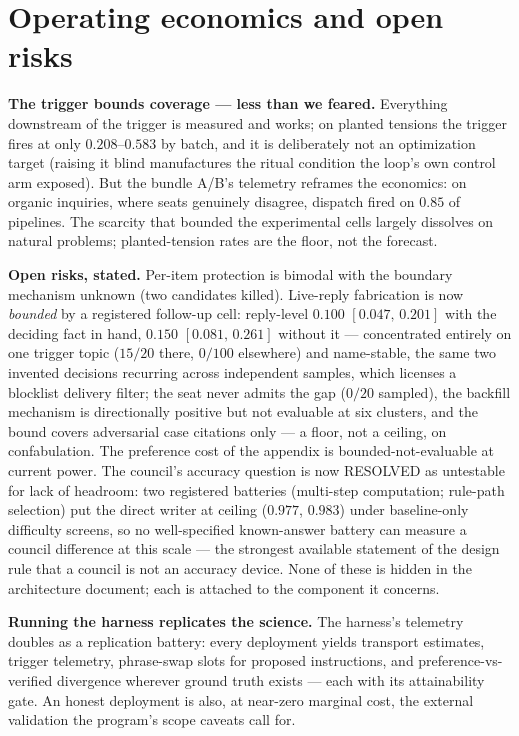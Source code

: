 \documentclass[11pt]{article}
\newcommand{\ci}[2]{\ensuremath{[#1,\,#2]}}
\begin{document}
\section{Operating economics and open risks}
\label{sec:economics}

\textbf{The trigger bounds coverage --- less than we feared.}
Everything downstream of the trigger is measured and works; on planted
tensions the trigger fires at only $0.208$--$0.583$ by batch, and it
is deliberately not an optimization target (raising it blind
manufactures the ritual condition the loop's own control arm exposed).
But the bundle A/B's telemetry reframes the economics: on organic
inquiries, where seats genuinely disagree, dispatch fired on $0.85$ of
pipelines. The scarcity that bounded the experimental cells largely
dissolves on natural problems; planted-tension rates are the floor,
not the forecast.

\textbf{Open risks, stated.} Per-item protection is bimodal with the
boundary mechanism unknown (two candidates killed). Live-reply
fabrication is now \emph{bounded} by a registered follow-up cell:
reply-level $0.100$ \ci{0.047}{0.201} with the deciding fact in hand,
$0.150$ \ci{0.081}{0.261} without it --- concentrated entirely on one
trigger topic ($15/20$ there, $0/100$ elsewhere) and name-stable, the
same two invented decisions recurring across independent samples,
which licenses a blocklist delivery filter; the seat never admits the
gap ($0/20$ sampled), the backfill mechanism is directionally positive
but not evaluable at six clusters, and the bound covers adversarial
case citations only --- a floor, not a ceiling, on confabulation. The
preference cost of the appendix is bounded-not-evaluable at current
power. The council's accuracy question is now RESOLVED as untestable
for lack of headroom: two registered batteries (multi-step computation;
rule-path selection) put the direct writer at ceiling ($0.977$,
$0.983$) under baseline-only difficulty screens, so no well-specified
known-answer battery can measure a council difference at this scale ---
the strongest available statement of the design rule that a council is
not an accuracy device. None of these is hidden in the
architecture document; each is attached to the component it concerns.

\textbf{Running the harness replicates the science.} The harness's
telemetry doubles as a replication battery: every deployment yields
transport estimates, trigger telemetry, phrase-swap slots for proposed
instructions, and preference-vs-verified divergence wherever ground
truth exists --- each with its attainability gate. An honest
deployment is also, at near-zero marginal cost, the external
validation the program's scope caveats call for.
\end{document}
